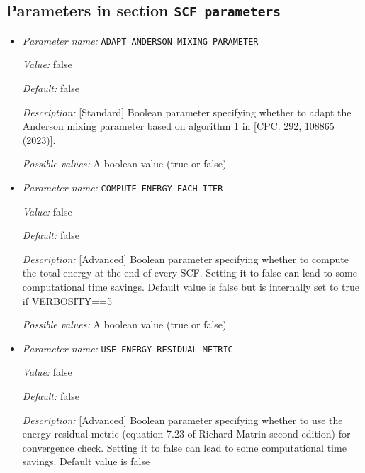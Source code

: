 \subsection{Parameters in section \tt SCF parameters}
\label{parameters:SCF_20parameters}

\begin{itemize}
\item {\it Parameter name:} {\tt ADAPT ANDERSON MIXING PARAMETER}
\label{parameters:SCF parameters/ADAPT ANDERSON MIXING PARAMETER}
\label{parameters:SCF_20parameters/ADAPT_20ANDERSON_20MIXING_20PARAMETER}


{\it Value:} false


{\it Default:} false


{\it Description:} [Standard] Boolean parameter specifying whether to adapt the Anderson mixing parameter based on algorithm 1 in [CPC. 292, 108865 (2023)].


{\it Possible values:} A boolean value (true or false)
\item {\it Parameter name:} {\tt COMPUTE ENERGY EACH ITER}
\label{parameters:SCF parameters/COMPUTE ENERGY EACH ITER}
\label{parameters:SCF_20parameters/COMPUTE_20ENERGY_20EACH_20ITER}


{\it Value:} false


{\it Default:} false


{\it Description:} [Advanced] Boolean parameter specifying whether to compute the total energy at the end of every SCF. Setting it to false can lead to some computational time savings. Default value is false but is internally set to true if VERBOSITY==5


{\it Possible values:} A boolean value (true or false)
\item {\it Parameter name:} {\tt USE ENERGY RESIDUAL METRIC}
\label{parameters:SCF parameters/USE ENERGY RESIDUAL METRIC}
\label{parameters:SCF_20parameters/USE_20ENERGY_20RESIDUAL_20METRIC}


{\it Value:} false


{\it Default:} false


{\it Description:} [Advanced] Boolean parameter specifying whether to use the energy residual metric (equation 7.23 of Richard Matrin second edition) for convergence check. Setting it to false can lead to some computational time savings. Default value is false



\end{itemize}
